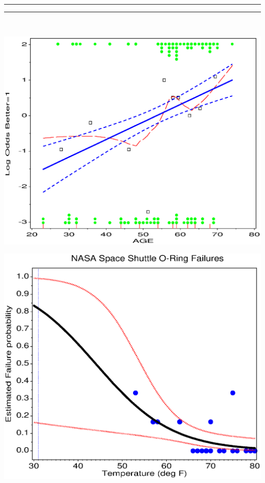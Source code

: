 \begin{center}
 \rule[-4pt]{0.5pt}{4pt}\hrulefill\rule[-4pt]{0.5pt}{4pt}\\
 \begin{minipage}[c]{.33\linewidth}
  \includegraphics[width=1\linewidth,clip=true]{ch6/fig/logoddt1}
 \end{minipage}%
 \hfill
 \begin{minipage}[c]{.33\linewidth}
  \includegraphics[width=1\linewidth,clip=true]{ch6/fig/nasa}
 \end{minipage}

\end{center}
